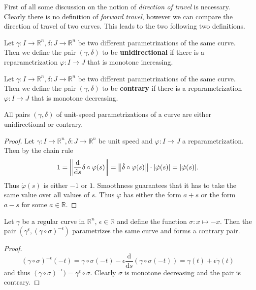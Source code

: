 \documentclass[11pt]{article}
\begin{document}
\begin{remark}
First of all some discussion on the notion of \textit{direction of travel} is necessary. Clearly there is no definition of \textit{forward travel}, however we can compare the direction of travel of two curves. This leads to the two following two definitions.
\end{remark}
\begin{definition}
Let $\gamma:I\to \mathbb R^n, \delta: J\to \mathbb R^n$ be two different parametrizations of the same curve. Then we define the pair $(\gamma, \delta)$ to be \textbf{unidirectional} if there is a reparametrization $\varphi: I\to J$ that is monotone increasing.
\end{definition}
\begin{definition}
Let $\gamma:I\to \mathbb R^n, \delta: J\to \mathbb R^n$ be two different parametrizations of the same curve. Then we define the pair $(\gamma, \delta)$ to be \textbf{contrary} if there is a reparametrization $\varphi: I\to J$ that is monotone decreasing.
\end{definition}
\begin{lemma}
All pairs $(\gamma,\delta)$ of unit-speed parametrizations of a curve are either unidirectional or contrary.
\end{lemma}
\begin{proof}
Let  $\gamma:I\to \mathbb R^n, \delta: J\to \mathbb R^n$ be unit speed and $\varphi: I\to J$ a reparametrization. Then by the chain rule $$1 =\left\lVert\frac{\mathrm d}{\mathrm ds}\delta\circ\varphi(s)\right\rVert = \left\lVert\dot\delta\circ \varphi(s)\right\rVert\cdot|\dot\varphi(s)| = |\dot\varphi(s)|.$$
Thus $\dot\varphi(s)$ is either $-1$ or $1$. Smoothness guarantees that it has to take the same value over all values of $s$. Thus $\varphi$ has either the form $a+s$ or the form $a-s$ for some $a\in \mathbb R$.
\end{proof}
\begin{lemma}
\label{lem:bic_dir}Let $\gamma$ be a regular curve in $\mathbb R^n$, $\epsilon\in \mathbb R$ and define the function $\sigma: x\mapsto -x$. Then the pair $(\gamma^\epsilon, (\gamma\circ\sigma)^{-\epsilon})$ parametrizes the same curve and forms a contrary pair.
\end{lemma}
\begin{proof}
\begin{equation*}
    (\gamma\circ\sigma)^{-\epsilon}(-t) = \gamma\circ\sigma(-t) -\epsilon\frac{\mathrm d}{\mathrm ds}(\gamma\circ\sigma(-t)) = \gamma(t) + \epsilon\dot\gamma(t)
\end{equation*}and thus $(\gamma\circ\sigma)^{-\epsilon}) = \gamma^\epsilon\circ\sigma$. Clearly $\sigma$ is monotone decreasing and the pair is contrary.
\end{proof}
\end{document}
